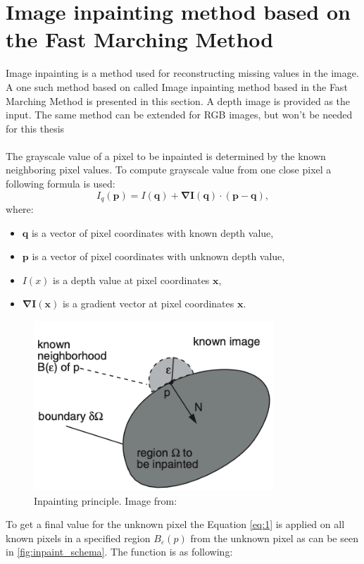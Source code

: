 \documentclass[twoside]{ctuthesis}
\theoremstyle{plain}
\theoremstyle{definition}
\theoremstyle{note}
\begin{document}
\section{Image inpainting method based on the Fast Marching Method} \label{inpainting}
Image inpainting is a method used for reconstructing missing values in the image. A one such method based on \cite{cite:5} called Image inpainting method based in the Fast Marching Method is presented in this section. A depth image is provided as the input. The same method can be extended for RGB images, but won't be needed for this thesis\\
\\
The grayscale value of a pixel to be inpainted is determined by the known neighboring pixel values. To compute grayscale value from one close pixel a following formula is used:
\begin{equation} \label{eq:1}
	I_q(\mathbf{p})=I(\mathbf{q})+\mathbf{\nabla I(q)}\cdot(\mathbf{p}-\mathbf{q}),
\end{equation}
where:
\begin{itemize}
	\item $\mathbf{q}$ is a vector of pixel coordinates with known depth value,
	\item $\mathbf{p}$ is a vector of pixel coordinates with unknown depth value,
	\item $I(x)$ is a depth value at pixel coordinates $\mathbf{x}$,
	\item $\mathbf{\nabla I(x)}$ is a gradient vector at pixel coordinates $\mathbf{x}$.
\end{itemize}
\begin{figure}[h]
	\centering
	\includegraphics[width=9cm]{inpaint_principle.png}
	\caption{Inpainting principle. Image from: \cite{cite:5}}
	\label{fig:inpaint_schema}
\end{figure}
To get a final value for the unknown pixel the Equation \ref{eq:1} is applied on all known pixels in a specified region $B_{\varepsilon}(p)$ from the unknown pixel as can be seen in  \autoref{fig:inpaint_schema}. The function is as following:
\end{document}
